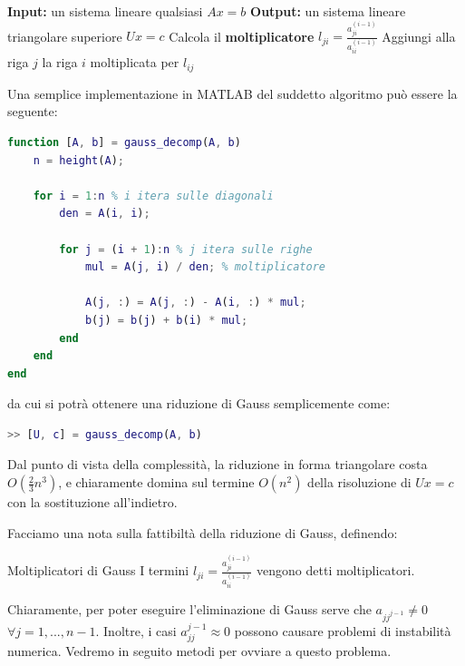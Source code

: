 \documentclass[a4paper,11pt]{article}
\begin{document}
\begin{algorithm}
\caption{Eliminazione di Gauss}
\begin{algorithmic}
	\STATE \textbf{Input:} un sistema lineare qualsiasi $Ax = b$ %
	\STATE \textbf{Output:} un sistema lineare triangolare superiore $Ux = c$ %
			\STATE Calcola il \textbf{moltiplicatore} $l_{ji} = \frac{a_{ji}^{(i - 1)}}{a_{ii}^{(i - 1)}}$
			\STATE Aggiungi alla riga $j$ la riga $i$ moltiplicata per $l_{ij}$
		\ENDFOR
	\ENDFOR
\end{algorithmic}
\end{algorithm}

Una semplice implementazione in MATLAB del suddetto algoritmo può essere la seguente:
\begin{lstlisting}[language=matlab, style=codestyle]	
function [A, b] = gauss_decomp(A, b)
    n = height(A);

    for i = 1:n % i itera sulle diagonali
        den = A(i, i);

        for j = (i + 1):n % j itera sulle righe
            mul = A(j, i) / den; % moltiplicatore
            
            A(j, :) = A(j, :) - A(i, :) * mul;
            b(j) = b(j) + b(i) * mul;
        end
    end
end
\end{lstlisting}
da cui si potrà ottenere una riduzione di Gauss semplicemente come:
\begin{lstlisting}[language=matlab, style=codestyle]	
	>> [U, c] = gauss_decomp(A, b)
\end{lstlisting}

\par\smallskip

Dal punto di vista della complessità, la riduzione in forma triangolare costa $O(\frac{2}{3}n^3)$, e chiaramente domina sul termine $O(n^2)$ della risoluzione di $Ux = c$ con la sostituzione all'indietro.

Facciamo una nota sulla fattibiltà della riduzione di Gauss, definendo:
\begin{definition}{Moltiplicatori di Gauss}
	I termini $l_{ji} = \frac{a_{ji}^{(i - 1)}}{a_{ii}^{(i - 1)}}$ vengono detti moltiplicatori.
\end{definition}
Chiaramente, per poter eseguire l'eliminazione di Gauss serve che $a_{jj^{j - 1}} \neq 0$ $\forall j = 1, ..., n - 1$.
Inoltre, i casi $a_{jj}^{j - 1} \approx 0$ possono causare problemi di instabilità numerica.
Vedremo in seguito metodi per ovviare a questo problema.
\end{document}
